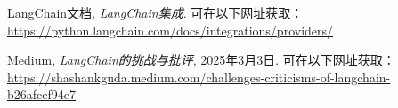 \documentclass[11pt, a4paper, oneside]{article}
\begin{document}
\begin{thebibliography}{99}
    LangChain文档, \textit{LangChain集成}. 可在以下网址获取：\url{https://python.langchain.com/docs/integrations/providers/}

    Medium, \textit{LangChain的挑战与批评}, 2025年3月3日. 可在以下网址获取：\url{https://shashankguda.medium.com/challenges-criticisms-of-langchain-b26afcef94e7}

\end{thebibliography}
\end{document}
